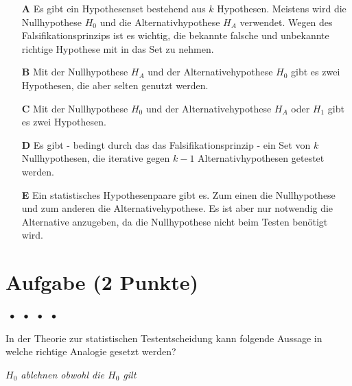 \documentclass[a4paper, 9pt]{scrartcl}\usepackage[]{graphicx}\usepackage[]{xcolor}
\begin{document}
\begin{enumerate}
\item [\textbf{A} \msquare] Es gibt ein Hypothesenset bestehend aus $k$ Hypothesen. Meistens wird die Nullhypothese $H_0$ und die Alternativhypothese $H_A$ verwendet. Wegen des Falsifikationsprinzips ist es wichtig, die bekannte falsche und unbekannte richtige Hypothese mit in das Set zu nehmen.
\item [\textbf{B} \msquare] Mit der Nullhypothese $H_A$ und der Alternativehypothese $H_0$ gibt es zwei Hypothesen, die aber selten genutzt werden.
\item [\textbf{C} \msquare] Mit der Nullhypothese $H_0$ und der Alternativehypothese $H_A$ oder $H_1$ gibt es zwei Hypothesen.
\item [\textbf{D} \msquare] Es gibt - bedingt durch das das Falsifikationsprinzip - ein Set von $k$ Nullhypothesen, die iterative gegen $k-1$ Alternativhypothesen getestet werden.
\item [\textbf{E} \msquare] Ein statistisches Hypothesenpaare gibt es. Zum einen die Nullhypothese und zum anderen die Alternativehypothese. Es ist aber nur notwendig die Alternative anzugeben, da die Nullhypothese nicht beim Testen benötigt wird.
\end{enumerate}

\section{Aufgabe \hfill (2 Punkte)}

\ifcollection
\begin{flushright}
\tiny\vspace{-2Ex}
\textbf{\examinhaltstart}
\exammodulemathstat $\;\bullet$
\exammodulestat $\;\bullet$
\exammodulestatbbv $\;\bullet$
\exammodulestatversuch $\;\bullet$
\exammodulebiostat
\vspace{-1Ex}
\end{flushright}
\fi




In der Theorie zur statistischen Testentscheidung kann folgende Aussage
in welche richtige Analogie gesetzt werden?

\begin{center}
\textit{$H_0$ ablehnen obwohl die $H_0$ gilt}
\end{center}
\end{document}
